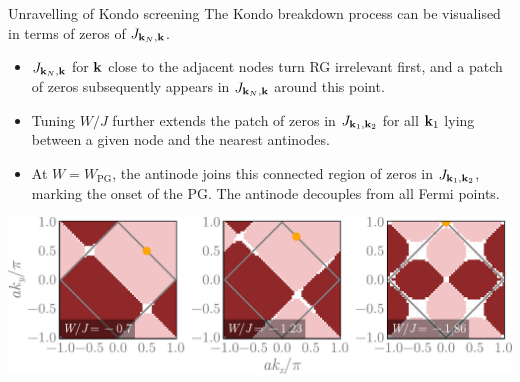 \documentclass[10pt,aspectratio=169]{beamer}
\begin{document}
\begin{frame}{Unravelling of Kondo screening}
	The Kondo breakdown process can be visualised in terms of \alert{zeros} of $J_{{\bf k}_N, {\bf k}}$.
\begin{itemize}[<+->]
	\item $J_{{\bf k}_N, {\bf k}}$ for ${\bf k}$ close to the \alert{adjacent nodes} turn RG irrelevant first, and a patch of zeros subsequently appears in $J_{{\bf k}_N, {\bf k}}$ around this point. 
	\item Tuning $W/J$ further extends the patch of zeros in $J_{{\bf k}_1, {\bf k}_2}$ for all ${\bf k}_{1}$ lying between a given node and the nearest antinodes. 
	\item At $W=W_{\text{PG}}$, the \alert{antinode} joins this connected region of zeros in $J_{{\bf k}_1, {\bf k}_2}$, marking the onset of the PG. The antinode \alert{decouples} from all Fermi points.
\end{itemize}

\begin{center}
    \includegraphics[width=0.8\linewidth]{zerosFlow.pdf}
\end{center}

\end{frame}
\end{document}
